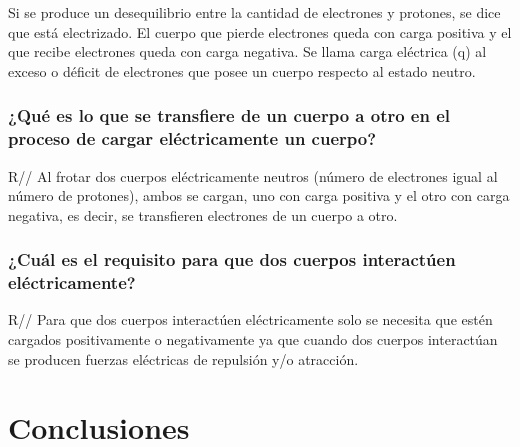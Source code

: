 \documentclass[letterpaper, 12pt]{report}
\begin{document}
Si se produce un desequilibrio entre la cantidad de electrones y
protones, se dice que está electrizado. El cuerpo que pierde electrones
queda con carga positiva y el que recibe electrones queda con carga negativa.
Se llama carga eléctrica (q) al exceso o déficit de electrones que posee un
cuerpo respecto al estado neutro.~\cite{CargaElectrica}

\subsubsection{¿Qué es lo que se transfiere de un cuerpo a otro en
	el proceso de cargar eléctricamente un cuerpo?}

R// Al frotar dos cuerpos eléctricamente neutros (número de electrones igual
al número de protones), ambos se cargan, uno con carga positiva y el otro con
carga negativa, es decir, se transfieren electrones de un cuerpo a otro.
~\cite{ElectrizacionWikipedia}

\subsubsection{¿Cuál es el requisito para que dos cuerpos interactúen
	eléctricamente?}

R// Para que dos cuerpos interactúen eléctricamente solo se necesita que
estén cargados positivamente o negativamente ya que cuando dos cuerpos
interactúan se producen fuerzas eléctricas de repulsión y/o atracción.
~\cite{TransferenciaParticulas}

\section{Conclusiones}

\newpage

\end{document}
